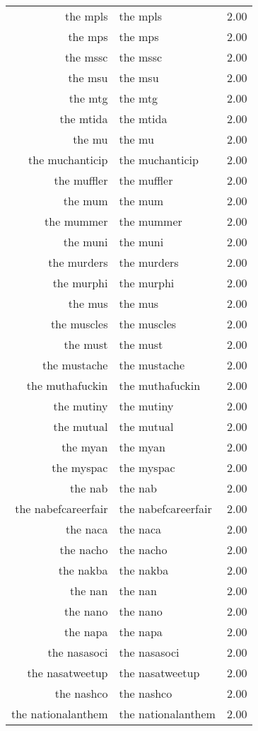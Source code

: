 \begin{table}[ht]
\begin{tabular}{rlr}
  the mpls & the mpls & 2.00 \\ 
  the mps & the mps & 2.00 \\ 
  the mssc & the mssc & 2.00 \\ 
  the msu & the msu & 2.00 \\ 
  the mtg & the mtg & 2.00 \\ 
  the mtida & the mtida & 2.00 \\ 
  the mu & the mu & 2.00 \\ 
  the muchanticip & the muchanticip & 2.00 \\ 
  the muffler & the muffler & 2.00 \\ 
  the mum & the mum & 2.00 \\ 
  the mummer & the mummer & 2.00 \\ 
  the muni & the muni & 2.00 \\ 
  the murders & the murders & 2.00 \\ 
  the murphi & the murphi & 2.00 \\ 
  the mus & the mus & 2.00 \\ 
  the muscles & the muscles & 2.00 \\ 
  the must & the must & 2.00 \\ 
  the mustache & the mustache & 2.00 \\ 
  the muthafuckin & the muthafuckin & 2.00 \\ 
  the mutiny & the mutiny & 2.00 \\ 
  the mutual & the mutual & 2.00 \\ 
  the myan & the myan & 2.00 \\ 
  the myspac & the myspac & 2.00 \\ 
  the nab & the nab & 2.00 \\ 
  the nabefcareerfair & the nabefcareerfair & 2.00 \\ 
  the naca & the naca & 2.00 \\ 
  the nacho & the nacho & 2.00 \\ 
  the nakba & the nakba & 2.00 \\ 
  the nan & the nan & 2.00 \\ 
  the nano & the nano & 2.00 \\ 
  the napa & the napa & 2.00 \\ 
  the nasasoci & the nasasoci & 2.00 \\ 
  the nasatweetup & the nasatweetup & 2.00 \\ 
  the nashco & the nashco & 2.00 \\ 
  the nationalanthem & the nationalanthem & 2.00 \\ 

\end{tabular}
\end{table}
